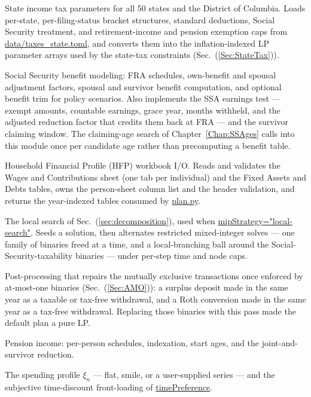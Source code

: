 \documentclass[fleqn,12pt]{report}
\newcommand{\code}[1]{\url{#1}}
\begin{document}
\begin{sloppypar}
\begin{description}[style=nextline, leftmargin=2.5cm, font=\ttfamily]
\item[tax\_state.py]
State income tax parameters for all 50 states and the District of Columbia.
Loads per-state, per-filing-status bracket structures, standard deductions,
Social Security treatment, and retirement-income and pension exemption caps
from \code{data/taxes_state.toml}, and converts them into the
inflation-indexed LP parameter arrays used by the state-tax constraints
(Sec.~(\ref{Sec:StateTax})).

\item[socialsecurity.py]
Social Security benefit modeling: FRA schedules, own-benefit and spousal
adjustment factors, spousal and survivor benefit computation, and optional
benefit trim for policy scenarios.
Also implements the SSA earnings test --- exempt amounts, countable earnings,
grace year, months withheld, and the adjusted reduction factor that credits them
back at FRA --- and the survivor claiming window.
The claiming-age search of Chapter~\ref{Chap:SSAges} calls into this module once
per candidate age rather than precomputing a benefit table.

\item[hfp\_io.py]
Household Financial Profile (HFP) workbook I/O.
Reads and validates the Wages and Contributions sheet (one tab per individual)
and the Fixed Assets and Debts tables, owns the person-sheet column list and the
header validation, and returns the year-indexed tables consumed by
\code{plan.py}.

\item[localsearch.py]
The local search of Sec.~(\ref{sec:decomposition}), used when
\code{mipStrategy="local-search"}.
Seeds a solution, then alternates restricted mixed-integer solves --- one family
of binaries freed at a time, and a local-branching ball around the
Social-Security-taxability binaries --- under per-step time and node caps.

\item[amorepair.py]
Post-processing that repairs the mutually exclusive transactions once enforced by
at-most-one binaries (Sec.~(\ref{Sec:AMO})): a surplus deposit made in the same
year as a taxable or tax-free withdrawal, and a Roth conversion made in the same
year as a tax-free withdrawal.
Replacing those binaries with this pass made the default plan a pure LP.

\item[pension.py]
Pension income: per-person schedules, indexation, start ages, and the
joint-and-survivor reduction.

\item[spending.py]
The spending profile $\xi_n$ --- flat, smile, or a user-supplied series ---
and the subjective time-discount front-loading of \code{timePreference}.


\end{description}
\end{sloppypar}
\end{document}

